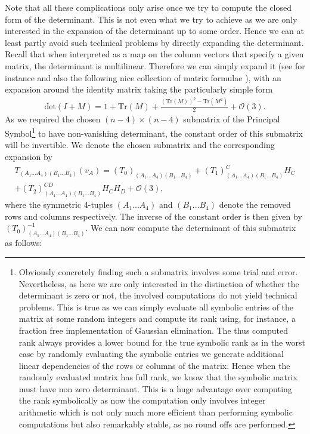 \documentclass[a4paper,12pt, DIV=14, BCOR=5mm, twoside, headsepline, numbers=noenddot]{scrbook}
\begin{document}
Note that all these complications only arise once we try to compute the closed form of the determinant. This is not even what we try to achieve as we are only interested in the expansion of the determinant up to some order. Hence we can at least partly avoid such technical problems by directly expanding the determinant. Recall that when interpreted as a map on the column vectors that specify a given matrix, the determinant is multilinear. Therefore we can simply expand it (see for instance \cite{2008CoTPh..49..801Z} and also the following nice collection of matrix formulae \cite{IMM2012-03274}), with an expansion around the identity matrix taking the particularly simple form 
\begin{align}\label{detExp}
    \mathrm{det}(I+M) = 1 + \mathrm{Tr}(M) + \frac{(\mathrm{Tr}(M))^2- \mathrm{Tr}(M^2)}{2} + \mathcal{O}(3). 
\end{align}
As we required the chosen $(n-4)\times (n-4)$ submatrix of the Principal Symbol\footnote{Obviously concretely finding such a submatrix involves some trial and error. Nevertheless, as here we are only interested in the distinction of whether the determinant is zero or not, the involved computations do not yield technical problems. This is true as we can simply evaluate all symbolic entries of the matrix at some random integers and compute its rank using, for instance, a fraction free implementation of Gaussian elimination. The thus computed rank always provides a lower bound for the true symbolic rank as in the worst case by randomly evaluating the symbolic entries we generate additional linear dependencies of the rows or columns of the matrix. Hence when the randomly evaluated matrix has full rank, we know that the symbolic matrix must have non zero determinant. This is a huge advantage over computing the rank symbolically as now the computation only involves integer arithmetic which is not only much more efficient than performing symbolic computations but also remarkably stable, as no round offs are performed.} to have non-vanishing determinant, the constant order of this submatrix will be invertible. We denote the chosen submatrix and the corresponding expansion by 
\begin{multline}
    T_{(A_1...A_4)(B_1...B_4)}(v_A) = (T_0)_{(A_1...A_4)(B_1...B_4)} + (T_1)_{(A_1...A_4)(B_1...B_4)}^{C} H_C \\
    +(T_2)_{(A_1...A_4)(B_1...B_4)}^{CD} H_C H_D + \mathcal{O}(3),
\end{multline}
where the symmetric 4-tuples $(A_1...A_4)$ and $(B_1...B_4)$ denote the removed rows and columns respectively. The inverse of the constant order is then given by $(T_0)^{-1}_{(A_1...A_4)(B_1...B_4)}$. We can now compute the determinant of this submatrix as follows:
\end{document}

